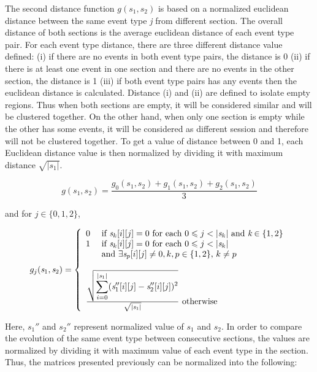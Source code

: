 \documentclass{vgtc}                          %
\begin{document}
The second distance function $\textit{g}(\textit{s}_1,\textit{s}_2)$ is based on a normalized euclidean distance between the same event type \textit{j} from different section. The overall distance of both sections is the average euclidean distance of each event type pair. For each event type distance, there are three different distance value defined: (i) if there are no events in both event type pairs, the distance is 0 (ii) if there is at least one event in one section and there are no events in the other section, the distance is 1 (iii) if both event type pairs has any events then the euclidean distance is calculated. Distance (i) and (ii) are defined to isolate empty regions. Thus when both sections are empty, it will be considered similar and will be clustered together. On the other hand, when only one section is empty while the other has some events, it will be considered as different session and therefore will not be clustered together. To get a value of distance between 0 and 1, each Euclidean distance value is then normalized by dividing it with maximum distance $\sqrt{\lvert\textit{s}_1\rvert}$.

$$\textit{g}(\textit{s}_1,\textit{s}_2) = \frac{\textit{g}_0(\textit{s}_1,\textit{s}_2) + \textit{g}_1(\textit{s}_1,\textit{s}_2) + \textit{g}_2(\textit{s}_1,\textit{s}_2)}{3}$$

and for $ j  \in \{0,1,2\}$,

\[ g_j(\textit{s}_1,\textit{s}_2) = \left\{
  \begin{array}{ll}
    0 & \text{ if } \textit{s}_k\lbrack i \rbrack\lbrack j \rbrack=0 \text{ for each } 0 \leqslant  j < |\textit{s}_k|\text{ and } \textit{k} \in \{1,2\}\\
    1 & \text{ if } \textit{s}_k\lbrack i \rbrack\lbrack j \rbrack=0 \text{ for each } 0 \leqslant j < |\textit{s}_k| \\
      & \text{} \text{ and } \exists \textit{s}_p\lbrack i \rbrack\lbrack j \rbrack \neq 0,\text{} k,p \in \{1,2\} \text{, } k \neq p\\
      & \\
	\multicolumn{2}{l}{\frac{\sqrt{\displaystyle\sum_{i=0}^{\lvert\textit{s}_1\lvert} (\textit{s}_1''\lbrack i \rbrack\lbrack j \rbrack - \textit{s}_2''\lbrack i \rbrack\lbrack j \rbrack)^2}}{\sqrt{\lvert\textit{s}_1\rvert}} \text{ otherwise}} 
  \end{array}
\right.
\]

Here, $s_1''$ and $s_2''$ represent normalized value of $s_1$ and $s_2$. In order to compare the evolution of the same event type between consecutive sections, the values are normalized by dividing it with maximum value of each event type in the section. Thus, the matrices presented previously can be normalized into the following:
\end{document}
